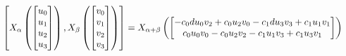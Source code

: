 \documentclass[11pt]{article}
\theoremstyle{definition}
\begin{document}
\[
\scaletoalign{\textwidth}{\left[ X_{\alpha}\left(\left[\begin{matrix}u_{0}\\u_{1}\\u_{2}\\u_{3}\end{matrix}\right]\right), X_{\beta}\left(\left[\begin{matrix}v_{0}\\v_{1}\\v_{2}\\v_{3}\end{matrix}\right]\right) \right] = X_{\alpha + \beta}\left(\left[\begin{matrix}- c_{0} d u_{0} v_{2} + c_{0} u_{2} v_{0} - c_{1} d u_{3} v_{3} + c_{1} u_{1} v_{1}\\c_{0} u_{0} v_{0} - c_{0} u_{2} v_{2} - c_{1} u_{1} v_{3} + c_{1} u_{3} v_{1}\end{matrix}\right]\right)}
\]
\end{document}
